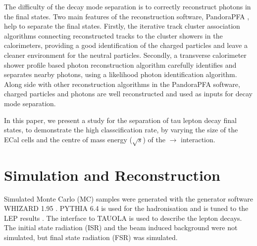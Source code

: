 \documentclass[a4paper,11pt]{article}
\newcommand{\rootS}{\ensuremath{\sqrt{s}}}
\begin{document}




The difficulty of the \PGt decay mode separation is to correctly reconstruct photons in the final states. Two main features of the reconstruction software, PandoraPFA \cite{Marshall:2015rfa}, help to separate the final states. Firstly, the iterative track cluster association algorithms connecting reconstructed tracks to the cluster showers in the calorimeters, providing a good identification of the charged particles and leave a cleaner environment for the neutral particles. Secondly, a transverse calorimeter shower profile based photon reconstruction algorithm carefully identifies and separates nearby photons, using a likelihood photon identification algorithm. Along side with other reconstruction algorithms in the PandoraPFA software, charged particles and photons are well reconstructed and used as inputs for \PGt decay mode separation.

In this paper, we present a study for the separation of tau lepton decay final states, to demonstrate the high classcification rate, by varying the size of the ECal cells and the centre of mass  energy (\rootS) of the \Pem\Pep $\to$ \PGtm\PGtp interaction.


\section{Simulation and Reconstruction}

Simulated Monte Carlo (MC) samples were generated with the generator software WHIZARD 1.95 \cite{whizard}. PYTHIA 6.4 \cite{Sjostrand:1995iq} is used for the hadronisation and is tuned to the LEP results \cite{}. The interface to TAUOLA \cite{Jadach:1993hs} is used to describe the \PGt lepton decays. The initial state radiation (ISR) and the beam induced background were not simulated, but final state radiation (FSR) was simulated. 
\end{document}
